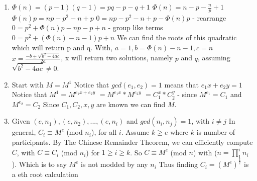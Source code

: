 \documentclass{assignment}
\begin{document}
\begin{problemlist}
\pbitem
\begin{problem}
\begin{enumerate}

\item
$\Phi(n) = (p-1)(q-1) = pq - p - q + 1$ \newline
$\Phi(n) = n - p - \frac{n}{p} + 1$ \newline
$\Phi(n)p = np - p^2 - n + p$ \newline
$0 = np - p^2 - n + p -\Phi(n)p$ - rearrange \newline
$0 = p^2 + \Phi(n)p - np - p + n$ - group like terms \newline
$0 = p^2 + (\Phi(n) - n - 1)p + n$ \newline
We can find the roots of this quadratic which will return p and q. \newline
With, $a = 1, b = \Phi(n) - n - 1, c = n$ \newline
$x=\frac{-b\pm\sqrt{b^2-4ac}}{2a}$, x will return two solutions, namely $p$ and $q$, assuming  $\sqrt{b^2-4ac} \neq 0.$\newline

\item
Start with $M = M^1$ \newline
Notice that $gcd(e_1,e_2) = 1$ means that $e_1x + e_2y = 1$ \newline
Notice that $M^1 = M^{e_1x + e_2y}$ \newline
$ = M^{e_1x} * M^{e_2y}$ \newline
$ = C_1^{x} * C_2^{y}$ - since $M^{e_1} = C_1$ and $M^{e_2} = C_2$  \newline
Since $C_1,C_2,x,y$ are known we can find $M$.\newline

\item
Given $(e,n_1),(e,n_2),...,(e,n_i)$ and $gcd(n_i,n_j) = 1$, with $i \neq j$\newline
In general, $C_i \equiv M^e$ (mod $n_i$), for all $i$. Assume $k \geq e$ where $k$ is number of participants. \newline
By The Chinese Remainder Theorem, we can efficiently compute $C$, \newline
with $C \equiv C_i$ (mod $n_i$) for $1 \geq i \geq k$. So $C \equiv M^e$ (mod $n$) with ($n = \prod_{1}^{i} n_i$). \newline
Which is to say $M^e$ is not modded by any $n_i$ \newline
Thus finding $C_i = (M^e)^\frac{1}{e}$ is a eth root calculation \newline


\end{enumerate}
\end{problem}
\end{problemlist}
\end{document}
